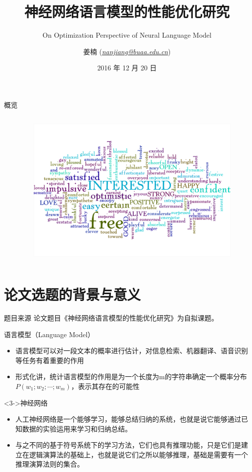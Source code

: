 \documentclass[14pt]{Bredelebeamer}
\title[研究生开题答辩]{神经网络语言模型的性能优化研究}
\subtitle{On Optimization Perspective of Neural Language Model}
\institute[]{北京航空航天大学计算机学院研究生开题答辩}
\author[\href{mailto:nanjiang@buaa.edu.cn}{ \textit{nanjiang@buaa.edu.cn}}]{姜楠 (\href{mailto:nanjiang@buaa.edu.cn}{\textit{nanjiang@buaa.edu.cn}})}
\date{ 2016 年 12 月 20 日}
\begin{document}
\begin{frame}
  \titlepage
\end{frame}

\begin{frame}{概览}
  \begin{columns}
    \begin{column}{.5\textwidth}
        \tableofcontents
    \end{column}
    \begin{column}{.5\textwidth}
      \begin{figure}
        \centering
        \includegraphics[width=1.\textwidth]{images/word-cloud.png}
      \end{figure}
    \end{column}
  \end{columns}
\end{frame}

\section{论文选题的背景与意义}
\begin{frame}{题目来源}
  论文题目《神经网络语言模型的性能优化研究》为自拟课题。
  \pause
  \begin{alertblock}{语言模型（Language Model）}
    \begin{itemize}
      \item 语言模型可以对一段文本的概率进行估计，对信息检索、机器翻译、语音识别等任务有着重要的作用
      \item 形式化讲，统计语言模型的作用是为一个长度为m的字符串确定一个概率分布$P(w_1;w_2; \cdots ;w_m)$，表示其存在的可能性
    \end{itemize}
  \end{alertblock}
  \pause
  \begin{block}<3->{神经网络}
    \begin{itemize}
      \item 人工神经网络是一个能够学习，能够总结归纳的系统，也就是说它能够通过已知数据的实验运用来学习和归纳总结。
      \item 与之不同的基于符号系统下的学习方法，它们也具有推理功能，只是它们是建立在逻辑演算法的基础上，也就是说它们之所以能够推理，基础是需要有一个推理演算法则的集合。
    \end{itemize}
  \end{block}
\end{frame}
\end{document}
